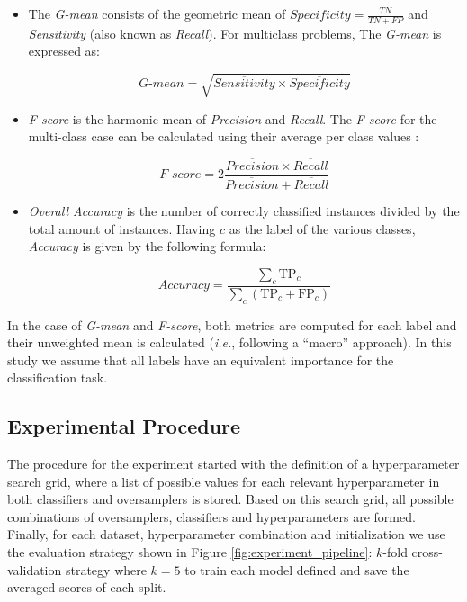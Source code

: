 \begin{itemize}
    \item The \textit{G-mean} consists of the geometric mean of $Specificity =
        \frac{TN}{TN + FP}$ and \textit{Sensitivity} (also known as
        \textit{Recall}). For multiclass problems, The \textit{G-mean} is
        expressed as:

        $$\textit{G-mean} = \sqrt{ \overline{Sensitivity} \times
        \overline{Specificity}}$$

    \item \textit{F-score} is the harmonic mean of \textit{Precision} and
        \textit{Recall}. The \textit{F-score} for the multi-class case can be
        calculated using their average per class values \cite{He2009}:

          $$\textit{F-score}=2\frac{\overline{Precision} \times
          \overline{Recall}}{\overline{Precision} + \overline{Recall}}$$

    \item \textit{Overall Accuracy} is the number of correctly classified
        instances divided by the total amount of instances. Having \( c \) as
        the label of the various classes, \textit{Accuracy} is given by the
        following formula:

          $$\textit{Accuracy} = \frac{ \sum\limits_{c}{ \text{TP}_{c} } }{
          \sum\limits_{c}{ (\text{TP}_{c}  + \text{FP}_{c}) } } $$

\end{itemize}

In the case of \textit{G-mean} and \textit{F-score}, both metrics are computed
for each label and their unweighted mean is calculated (\textit{i.e.},
following a ``macro'' approach). In this study we assume that all labels
have an equivalent importance for the classification task.

\subsection{Experimental Procedure}

The procedure for the experiment started with the definition of a
hyperparameter search grid, where a list of possible values for each relevant
hyperparameter in both classifiers and oversamplers is stored. Based on this
search grid, all possible combinations of oversamplers, classifiers and
hyperparameters are formed.  Finally, for each dataset, hyperparameter
combination and initialization we use the evaluation strategy shown in Figure
\ref{fig:experiment_pipeline}: $k$-fold cross-validation strategy where $k=5$
to train each model defined and save the averaged scores of each split.

